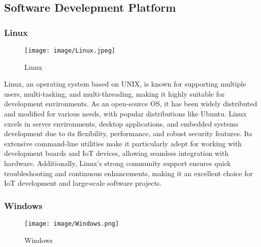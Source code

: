 \documentclass[conference]{IEEEtran}
\begin{document}
\subsection{Software Develepment Platform}

\subsubsection{Linux}

\begin{figure}[h!]
    \centering
    \texttt{[image: image/Linux.jpeg]}
    \caption{Linux}
    \label{fig:enter-label}
\end{figure}

\noindent Linux, an operating system based on UNIX, is known for supporting multiple users, multi-tasking, and multi-threading, making it highly suitable for development environments. As an open-source OS, it has been widely distributed and modified for various needs, with popular distributions like Ubuntu. Linux excels in server environments, desktop applications, and embedded systems development due to its flexibility, performance, and robust security features. Its extensive command-line utilities make it particularly adept for working with development boards and IoT devices, allowing seamless integration with hardware. Additionally, Linux’s strong community support ensures quick troubleshooting and continuous enhancements, making it an excellent choice for IoT development and large-scale software projects.\\

\subsubsection{Windows}

\begin{figure}[h!]
    \centering
    \texttt{[image: image/Windows.png]}
    \caption{Windows}
    \label{fig:enter-label}
\end{figure}
\end{document}
